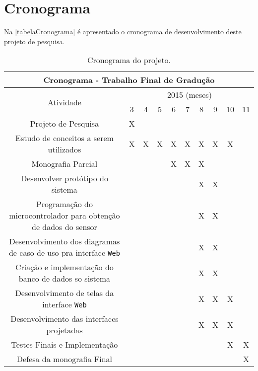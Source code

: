 \chapter[Cronograma]{Cronograma}

Na \autoref{tabelaCronograma} é apresentado o cronograma de desenvolvimento deste projeto de pesquisa.

\begin{table}[htb]
	\ABNTEXfontereduzida	
	\begin{center}
		\caption[Cronograma]{Cronograma do projeto.}
		\label{tabelaCronograma}
		\begin{tabular}{ |c|c|c|c|c|c|c|c|c|c| }
		   	\hline
			\multicolumn{10}{|c|}{Cronograma - Trabalho Final de Gradução} \\
			\hline
			\multirow{2}{*}{Atividade} & \multicolumn{9}{c|}{2015 (meses)} \\
			\cline{2-10}
			& 3 & 4 & 5 & 6 & 7 & 8 & 9 & 10 & 11 \\
			\hline
			Projeto de Pesquisa & X & & & & & & & & \\
			\hline
			Estudo de conceitos a serem utilizados & X & X & X & X & X & X & X & X & \\
			\hline
			Monografia Parcial & & & & X & X & X & & & \\
			\hline
			Desenvolver protótipo do sistema & & & & & & X & X & & \\
			\hline
			Programação do microcontrolador para obtenção de dados do sensor & & & & & & X & X & & \\
			\hline
			Desenvolvimento dos diagramas de caso de uso pra interface \texttt{Web} & & & & & & X & X & & \\
			\hline
			Criação e implementação do banco de dados so sistema & & & & & & X & X & & \\
			\hline
			Desenvolvimento de telas da interface \texttt{Web} & & & & & & X & X & X &\\
			\hline
			Desenvolvimento das interfaces projetadas & & & & & & X & X & X & \\
			\hline
			Testes Finais e Implementação & & & & & & & & X & X \\
			\hline
			Defesa da monografia Final & & & & & & & & & X \\
			\hline
		\end{tabular}
	\end{center}
\end{table}
